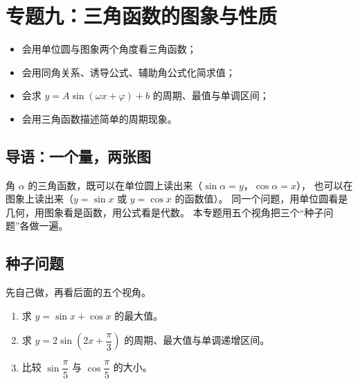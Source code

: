 \section{专题九：三角函数的图象与性质}

\begin{learnobjective}
\begin{itemize}
  \item 会用单位圆与图象两个角度看三角函数；
  \item 会用同角关系、诱导公式、辅助角公式化简求值；
  \item 会求 $y=A\sin(\omega x+\varphi)+b$ 的周期、最值与单调区间；
  \item 会用三角函数描述简单的周期现象。
\end{itemize}
\end{learnobjective}

\begin{preview}
\subsection{导语：一个量，两张图}
角 $\alpha$ 的三角函数，既可以在单位圆上读出来（$\sin\alpha=y$，$\cos\alpha=x$），
也可以在图象上读出来（$y=\sin x$ 或 $y=\cos x$ 的函数值）。
同一个问题，用单位圆看是几何，用图象看是函数，用公式看是代数。
本专题用五个视角把三个“种子问题”各做一遍。

\subsection{种子问题}
先自己做，再看后面的五个视角。
\begin{enumerate}
  \item 求 $y=\sin x+\cos x$ 的最大值。
  \item 求 $y=2\sin\left(2x+\dfrac{\pi}{3}\right)$ 的周期、最大值与单调递增区间。
  \item 比较 $\sin\dfrac{\pi}{5}$ 与 $\cos\dfrac{\pi}{5}$ 的大小。
\end{enumerate}
\end{preview}

